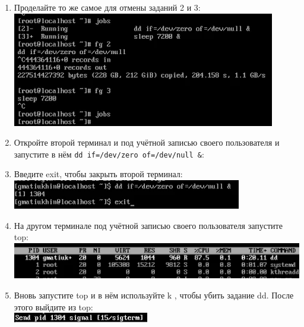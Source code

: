 \documentclass[12pt]{article}
\begin{document}
\begin{enumerate}
	\item Проделайте то же самое для отмены заданий 2 и 3: \\
	      \includegraphics{7.png}
	\item Откройте второй терминал и под учётной записью своего пользователя и запустите в нём \texttt{dd if=/dev/zero of=/dev/null \&}:
	\item Введите exit, чтобы закрыть второй терминал: \\
	      \includegraphics{8.png}
	\item На другом терминале под учётной записью своего пользователя запустите top: \\
	      \includegraphics{9.png}
	\item Вновь запустите top и в нём используйте k , чтобы убить задание dd. После этого выйдите из top: \\
	      \includegraphics{10.png}
\end{enumerate}
\end{document}
